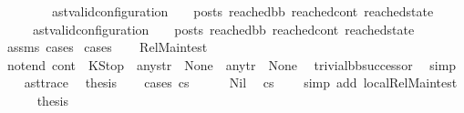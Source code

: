 \begin{isabellebody}
\ \ \ \ \ \ \ \ {\isacharparenleft}{\kern0pt}ast{\isacharunderscore}{\kern0pt}valid{\isacharunderscore}{\kern0pt}configuration\ {\isasymLambda}\ {\isasymGamma}\ {\isasymOmega}\ posts\ reached{\isacharunderscore}{\kern0pt}bb\ reached{\isacharunderscore}{\kern0pt}cont\ reached{\isacharunderscore}{\kern0pt}state{\isacharparenright}{\kern0pt}{\isachardoublequoteclose}\isanewline
\ \ \ \ \ {\isachardoublequoteopen}{\isacharparenleft}{\kern0pt}ast{\isacharunderscore}{\kern0pt}valid{\isacharunderscore}{\kern0pt}configuration\ {\isasymLambda}\ {\isasymGamma}\ {\isasymOmega}\ posts\ reached{\isacharunderscore}{\kern0pt}bb\ reached{\isacharunderscore}{\kern0pt}cont\ reached{\isacharunderscore}{\kern0pt}state{\isacharparenright}{\kern0pt}{\isachardoublequoteclose}\ \isanewline
%
\isadelimproof
\ \ %
\endisadelimproof
%
\isatagproof
{}\isamarkupfalse%
\ assms\ cases\isanewline
{}\isamarkupfalse%
\ cases\isanewline
\ \ \isamarkupfalse%
\ Rel{\isacharunderscore}{\kern0pt}Main{\isacharunderscore}{\kern0pt}test\isanewline
\ \ \isamarkupfalse%
\ not{\isacharunderscore}{\kern0pt}end{\isacharcolon}{\kern0pt}\ {\isachardoublequoteopen}{\isacharparenleft}{\kern0pt}cont{}\ {\isasymnoteq}\ KStop{\isacharparenright}{\kern0pt}\ {\isasymor}\ any{\isacharunderscore}{\kern0pt}str\ {\isasymnoteq}\ None\ {\isasymor}\ any{\isacharunderscore}{\kern0pt}tr\ {\isasymnoteq}\ None{\isachardoublequoteclose}\ \isamarkupfalse%
\ trivial{\isacharunderscore}{\kern0pt}bb{\isacharunderscore}{\kern0pt}successor\ \isamarkupfalse%
\ simp\isanewline
\ \ \isamarkupfalse%
\ ast{\isacharunderscore}{\kern0pt}trace\ \isamarkupfalse%
\ {\isacharquery}{\kern0pt}thesis\isanewline
\ \ \isamarkupfalse%
\ {\isacharparenleft}{\kern0pt}cases\ cs{}{\isacharparenright}{\kern0pt}\isanewline
\ \ \ \ \isamarkupfalse%
\ Nil\ \isamarkupfalse%
\ {\isacartoucheopen}cs{}\ {\isacharequal}{\kern0pt}\ {\isacharbrackleft}{\kern0pt}{\isacharbrackright}{\kern0pt}{\isacartoucheclose}\ \isamarkupfalse%
\ {\isacharparenleft}{\kern0pt}simp\ add{\isacharcolon}{\kern0pt}\ local{\isachardot}{\kern0pt}Rel{\isacharunderscore}{\kern0pt}Main{\isacharunderscore}{\kern0pt}test{\isacharparenleft}{\kern0pt}{}{\isacharparenright}{\kern0pt}{\isacharparenright}{\kern0pt}\isanewline
\ \ \ \ \isamarkupfalse%
\ {\isacharquery}{\kern0pt}thesis\ \isamarkupfalse%

\end{isabellebody}
